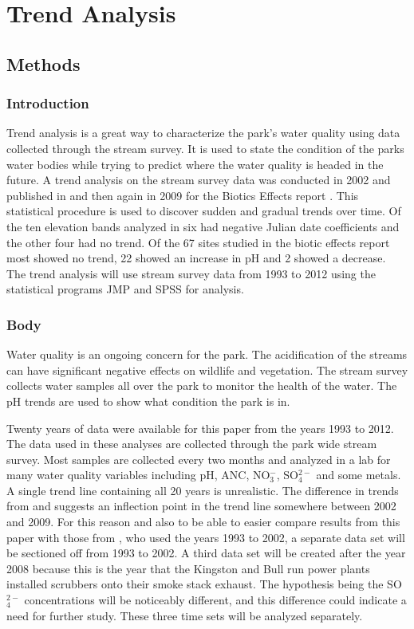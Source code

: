 \chapter{Trend Analysis}\label{ch:TA}
\section{Methods}
\subsection{Introduction}

Trend analysis is a great way to characterize the park's water quality using data collected through the stream survey. It is used to state the condition of the parks water bodies while trying to predict where the water quality is headed in the future. A trend analysis on the stream survey data was conducted in 2002 and published in \citep{robinson2008ph} and then again in 2009 for the Biotics Effects report \citep{cai2012}. This statistical procedure is used to discover sudden and gradual trends over time. Of the ten elevation bands analyzed in \citep{robinson2008ph} six had negative Julian date coefficients and the other four had no trend. Of the 67 sites studied in the biotic effects report most showed no trend, 22 showed an increase in pH and 2 showed a decrease\citep{cai2012}. The trend analysis will use stream survey data from 1993 to 2012 using the statistical programs JMP and SPSS for analysis.

\subsection{Body}

Water quality is an ongoing concern for the park. The acidification of the streams can have significant negative effects on wildlife and vegetation. The stream survey collects water samples all over the park to monitor the health of the water. The pH trends are used to show what condition the park is in.
    
Twenty years of data were available for this paper from the years 1993 to 2012. The data used in these analyses are collected through the park wide stream survey. Most samples are collected every two months and analyzed in a lab for many water quality variables including pH, ANC, NO$_3^-$, SO$_4^{2-}$ and some metals. %
A single trend line containing all 20 years is unrealistic. The difference in trends from \citet{robinson2008ph} and \citet{cai2012} suggests an inflection point in the trend line somewhere between 2002 and 2009. For this reason and also to be able to easier compare results from this paper with those from \citet{robinson2008ph}, who used the years 1993 to 2002, a separate data set will be sectioned off from 1993 to 2002. A third data set will be created after the year 2008 because this is the year that the Kingston and Bull run power plants installed scrubbers onto their smoke stack exhaust. The hypothesis being the SO$_4^{2-}$ concentrations will be noticeably different, and this difference could indicate a need for further study. These three time sets will be analyzed separately.

